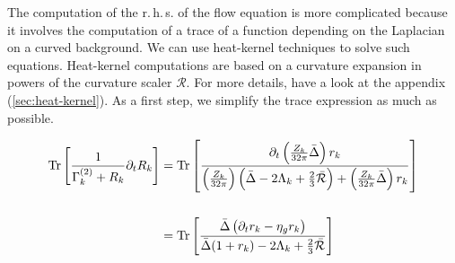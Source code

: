 The computation of the r.\,h.\,s. of the flow equation is more complicated because it involves the computation of a trace of a function depending on the Laplacian on a curved background. We can use heat-kernel techniques to solve such equations. Heat-kernel computations are based on a curvature expansion in powers of the curvature scaler $\mathcal{R}$. For more details, have a look at the appendix (\ref{sec:heat-kernel}). As a first step, we simplify the trace expression as much as possible.

\begin{align}
\operatorname{Tr}\left[\frac{1}{\Gamma_{k}^{(2)} + R_k}\partial_t R_k\right] & = \operatorname{Tr}\left[\frac{\partial_t\left(\frac{Z_k}{32\pi}\bar{\Delta}\right)r_k}{\left(\frac{Z_k}{32\pi}\right)\left(\bar{\Delta} - 2\Lambda_k + \frac{2}{3}\bar{\mathcal{R}}\right) + \left(\frac{Z_k}{32\pi}\bar{\Delta}\right) r_k}\right]	\nonumber \\
\phantom{.} \\
&= \operatorname{Tr}\left[\frac{\bar{\Delta}\left(\partial_t r_k - \eta_g r_k\right)}{\bar{\Delta}(1+r_k)-2\Lambda_k+\frac{2}{3}\bar{\mathcal{R}}}\right] \nonumber
\end{align}


